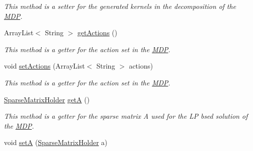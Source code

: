 \begin{DoxyCompactItemize}
\begin{DoxyCompactList}\small\item\em This method is a setter for the generated kernels in the decomposition of the \hyperlink{classese_1_1seas_1_1upenn_1_1edu_1_1_m_d_p}{M\+D\+P}. \end{DoxyCompactList}\item 
\hypertarget{classese_1_1seas_1_1upenn_1_1edu_1_1_m_d_p_a31ed86f0220c9f7be5ea0d94f6bed158}{}Array\+List$<$ String $>$ \hyperlink{classese_1_1seas_1_1upenn_1_1edu_1_1_m_d_p_a31ed86f0220c9f7be5ea0d94f6bed158}{get\+Actions} ()\label{classese_1_1seas_1_1upenn_1_1edu_1_1_m_d_p_a31ed86f0220c9f7be5ea0d94f6bed158}

\begin{DoxyCompactList}\small\item\em This method is a getter for the action set in the \hyperlink{classese_1_1seas_1_1upenn_1_1edu_1_1_m_d_p}{M\+D\+P}. \end{DoxyCompactList}\item 
\hypertarget{classese_1_1seas_1_1upenn_1_1edu_1_1_m_d_p_a52101821393d66680dcd69c7f7ef01a8}{}void \hyperlink{classese_1_1seas_1_1upenn_1_1edu_1_1_m_d_p_a52101821393d66680dcd69c7f7ef01a8}{set\+Actions} (Array\+List$<$ String $>$ actions)\label{classese_1_1seas_1_1upenn_1_1edu_1_1_m_d_p_a52101821393d66680dcd69c7f7ef01a8}

\begin{DoxyCompactList}\small\item\em This method is a getter for the action set in the \hyperlink{classese_1_1seas_1_1upenn_1_1edu_1_1_m_d_p}{M\+D\+P}. \end{DoxyCompactList}\item 
\hypertarget{classese_1_1seas_1_1upenn_1_1edu_1_1_m_d_p_abcf776de607259732ac95c18ab83610f}{}\hyperlink{classese_1_1seas_1_1upenn_1_1edu_1_1_sparse_matrix_holder}{Sparse\+Matrix\+Holder} \hyperlink{classese_1_1seas_1_1upenn_1_1edu_1_1_m_d_p_abcf776de607259732ac95c18ab83610f}{get\+A} ()\label{classese_1_1seas_1_1upenn_1_1edu_1_1_m_d_p_abcf776de607259732ac95c18ab83610f}

\begin{DoxyCompactList}\small\item\em This method is a getter for the sparse matrix A used for the L\+P bsed solution of the \hyperlink{classese_1_1seas_1_1upenn_1_1edu_1_1_m_d_p}{M\+D\+P}. \end{DoxyCompactList}\item 
\hypertarget{classese_1_1seas_1_1upenn_1_1edu_1_1_m_d_p_a1d46e0b774323aa26cebd2b3c2f947dc}{}void \hyperlink{classese_1_1seas_1_1upenn_1_1edu_1_1_m_d_p_a1d46e0b774323aa26cebd2b3c2f947dc}{set\+A} (\hyperlink{classese_1_1seas_1_1upenn_1_1edu_1_1_sparse_matrix_holder}{Sparse\+Matrix\+Holder} a)\label{classese_1_1seas_1_1upenn_1_1edu_1_1_m_d_p_a1d46e0b774323aa26cebd2b3c2f947dc}


\end{DoxyCompactItemize}
